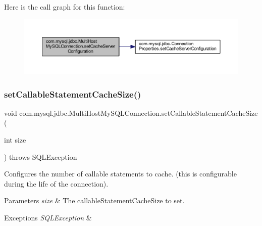 Here is the call graph for this function\+:
\nopagebreak
\begin{figure}[H]
\begin{center}
\leavevmode
\includegraphics[width=350pt]{classcom_1_1mysql_1_1jdbc_1_1_multi_host_my_s_q_l_connection_a0e3c4d032287df8965fe62da0755c244_cgraph}
\end{center}
\end{figure}
\mbox{\label{classcom_1_1mysql_1_1jdbc_1_1_multi_host_my_s_q_l_connection_a738d6bb9fa72c912b24fa0fb9d978af9}} 
\subsubsection{\texorpdfstring{set\+Callable\+Statement\+Cache\+Size()}{setCallableStatementCacheSize()}}
{\footnotesize\ttfamily void com.\+mysql.\+jdbc.\+Multi\+Host\+My\+S\+Q\+L\+Connection.\+set\+Callable\+Statement\+Cache\+Size (\begin{DoxyParamCaption}\item[{int}]{size }\end{DoxyParamCaption}) throws S\+Q\+L\+Exception}

Configures the number of callable statements to cache. (this is configurable during the life of the connection).


\begin{DoxyParams}{Parameters}
{\em size} & The callable\+Statement\+Cache\+Size to set. \\
\hline
\end{DoxyParams}

\begin{DoxyExceptions}{Exceptions}
{\em S\+Q\+L\+Exception} & \\
\hline
\end{DoxyExceptions}


